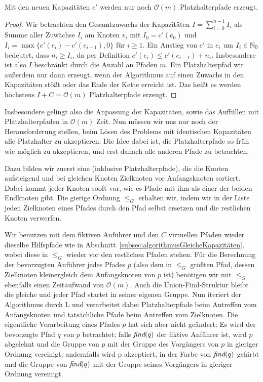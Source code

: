 \begin{lemma}
    Mit den neuen Kapazitäten $c'$ werden nur noch $\mathcal O(m)$ Platzhalterpfade erzeugt.
\end{lemma}
\begin{proof}
    Wir betrachten den Gesamtzuwachs der Kapazitäten $I = \sum_{i = 0}^{n-1} I_i$ als Summe aller Zuwächse $I_i$ am
    Knoten $v_i$ mit $I_0 = c'(e_0)$ und $I_i = \max\{c'(e_i) - c'(e_{i-1}), 0\}$ für $i \geq 1$.
    Ein Anstieg von $c'$ in $e_i$ um $I_i \in \mathbb N_0$ bedeutet, dass $n_i \geq I_i$, da per Definition
    $c'(e_i) \leq c'(e_{i-1}) + n_i$.
    Insbesondere ist also $I$ beschränkt durch die Anzahl an Pfaden $m$.
    Ein Platzhalterpfad wir außerdem nur dann erzeugt, wenn der Algorithmus auf einen Zuwachs in den Kapazitäten stößt
    oder das Ende der Kette erreicht ist.
    Das heißt es werden höchstens $I + C = \mathcal O(m)$ Platzhalterpfade erzeugt.
\end{proof}

Insbesondere gelingt also die Anpassung der Kapazitäten, sowie das Auffüllen mit Platzhalterpfaden in $\mathcal O(m)$ Zeit.
Nun müssen wir uns nur noch der Herausforderung stellen, beim Lösen des Problems mit identischen Kapazitäten alle
Platzhalter zu akzeptieren.
Die Idee dabei ist, die Platzhalterpfade so früh wie möglich zu akzeptieren, und erst danach alle anderen Pfade zu
betrachten.

Dazu bilden wir zuerst eine  (inklusive Platzhalterpfade), die die Knoten
aufsteigend und bei gleichen Knoten Zielknoten vor Anfangsknoten sortiert.
Dabei kommt jeder Knoten sooft vor, wie es Pfade mit ihm als einer der beiden Endknoten gibt.
Die gierige Ordnung $\leq_{G}$ erhalten wir, indem wir in der Liste jeden Zielknoten eines Pfades durch den Pfad selbst
ersetzen und die restlichen Knoten verwerfen.

Wir benutzen mit dem fiktiven Anführer und den $C$ virtuellen Pfaden wieder dieselbe Hilfspfade wie in
Abschnitt~\ref{subsec:algorithmusGleicheKapazitäten}, wobei diese in $\leq_G$ wieder vor den restlichen Pfaden stehen.
Für die Berechnung der bevorzugten Anführer jedes Pfades $p$ (also dem in $\leq_G$ größten Pfad, dessen
Zielknoten kleinergleich dem Anfangsknoten von $p$ ist) benötigen wir mit $\leq_G$ ebenfalls einen Zeitaufwand von
$\mathcal O(m)$.
Auch die Union-Find-Struktur bleibt die gleiche und jeder Pfad startet in seiner eigenen Gruppe.
Nun iteriert der Algorithmus durch L und verarbeitet dabei Platzhalterpfade beim Antreffen vom
Anfangsknoten und tatsächliche Pfade beim Antreffen vom Zielknoten.
Die eigentliche Verarbeitung eines Pfades $p$ hat sich aber nicht geändert: Es wird der bevorzugte Pfad $q$ von $p$
betrachtet;
falls $\text{\em find}(q)$ der fiktive Anführer ist, wird $p$ abgelehnt und die Gruppe von $p$ mit der
Gruppe des Vorgängers von $p$ in gieriger Ordnung vereinigt;
andernfalls wird p akzeptiert, in der Farbe von $\text{\em find}(q)$
gefärbt und die Gruppe von $\text{\em find}(q)$ mit der Gruppe seines Vorgängers in gieriger Ordnung vereinigt.

